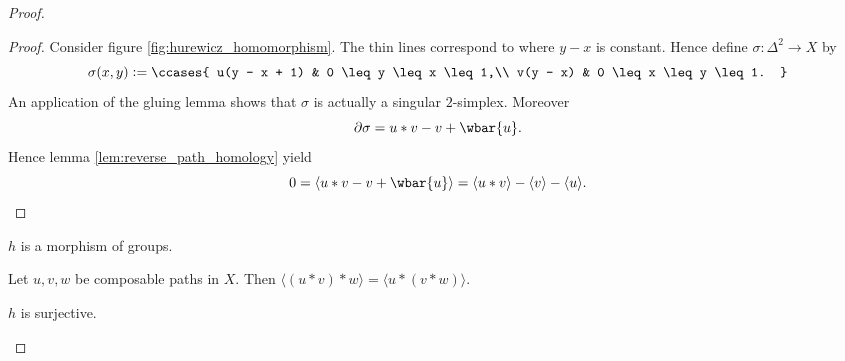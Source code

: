 \begin{proof}
	\begin{proof}
		Consider figure \ref{fig:hurewicz_homomorphism}. The thin lines correspond to where $y - x$ is constant. Hence define $\sigma : \Delta^2 \to X$ by
		\begin{equation*}
			\sigma(x,y) := \ccases{
				u(y - x + 1) & 0 \leq y \leq x \leq 1,\\
				v(y - x) & 0 \leq x \leq y \leq 1.
			}
		\end{equation*}
		An application of the gluing lemma shows that $\sigma$ is actually a singular $2$-simplex. Moreover
		\begin{equation*}
			\partial \sigma = u \ast v - v + \wbar{u}.
		\end{equation*}
		Hence lemma \ref{lem:reverse_path_homology} yield
		\begin{equation*}
			0 = \langle u \ast v - v + \wbar{u}\rangle = \langle u \ast v \rangle - \langle v \rangle - \langle u \rangle.
		\end{equation*}
	\end{proof}

	\begin{corollary}
		$h$ is a morphism of groups.
		\label{cor:h_homomorphism}
	\end{corollary}

	\begin{corollary}
		Let $u,v,w$ be composable paths in $X$. Then $\langle (u \ast v) \ast w \rangle = \langle u \ast (v \ast w) \rangle$.
		\label{cor:composable_associative_homology}
	\end{corollary}

	\begin{lemma}
		$h$ is surjective.
	\end{lemma}


\end{proof}
